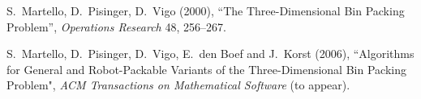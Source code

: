 \begin{thebibliography}{99}

 S.~Martello, D.~Pisinger, D.~Vigo (2000),
``The Three-Dimensional Bin Packing Problem'', {\em
Operations Research} 48, 256--267.

 S.~Martello,
D.~Pisinger, D.~Vigo, E.~den Boef and J.~Korst (2006), ``Algorithms for General and Robot-Packable Variants of
the Three-Dimensional Bin Packing Problem", {\em ACM Transactions on Mathematical Software} (to appear).
\end{thebibliography}



